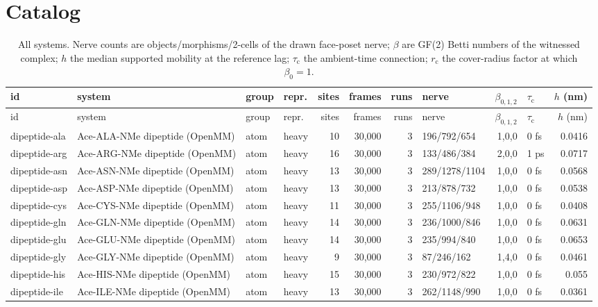 \documentclass[10pt]{article}
\begin{document}
\section*{Catalog}
\begin{small}\begin{longtable}{p{3.9cm}p{5.2cm}llrrrlrlr}
\caption{All systems. Nerve counts are objects/morphisms/2-cells of the drawn face-poset nerve; $\beta$ are GF(2) Betti numbers of the witnessed complex; $h$ the median supported mobility at the reference lag; $\tau_{\mathrm c}$ the ambient-time connection; $r_{\mathrm c}$ the cover-radius factor at which $\beta_0=1$.}\\
\toprule id & system & group & repr. & sites & frames & runs & nerve & $\beta_{0,1,2}$ & $\tau_{\mathrm c}$ & $h$ (nm)\\\midrule\endfirsthead
\toprule id & system & group & repr. & sites & frames & runs & nerve & $\beta_{0,1,2}$ & $\tau_{\mathrm c}$ & $h$ (nm)\\\midrule\endhead
dipeptide-ala & Ace-ALA-NMe dipeptide (OpenMM) & atom & heavy & 10 & 30,000 & 3 & 196/792/654 & 1,0,0 & 0 fs & 0.0416\\
dipeptide-arg & Ace-ARG-NMe dipeptide (OpenMM) & atom & heavy & 16 & 30,000 & 3 & 133/486/384 & 2,0,0 & 1 ps & 0.0717\\
dipeptide-asn & Ace-ASN-NMe dipeptide (OpenMM) & atom & heavy & 13 & 30,000 & 3 & 289/1278/1104 & 1,0,0 & 0 fs & 0.0568\\
dipeptide-asp & Ace-ASP-NMe dipeptide (OpenMM) & atom & heavy & 13 & 30,000 & 3 & 213/878/732 & 1,0,0 & 0 fs & 0.0538\\
dipeptide-cys & Ace-CYS-NMe dipeptide (OpenMM) & atom & heavy & 11 & 30,000 & 3 & 255/1106/948 & 1,0,0 & 0 fs & 0.0408\\
dipeptide-gln & Ace-GLN-NMe dipeptide (OpenMM) & atom & heavy & 14 & 30,000 & 3 & 236/1000/846 & 1,0,0 & 0 fs & 0.0631\\
dipeptide-glu & Ace-GLU-NMe dipeptide (OpenMM) & atom & heavy & 14 & 30,000 & 3 & 235/994/840 & 1,0,0 & 0 fs & 0.0653\\
dipeptide-gly & Ace-GLY-NMe dipeptide (OpenMM) & atom & heavy & 9 & 30,000 & 3 & 87/246/162 & 1,4,0 & 0 fs & 0.0461\\
dipeptide-his & Ace-HIS-NMe dipeptide (OpenMM) & atom & heavy & 15 & 30,000 & 3 & 230/972/822 & 1,0,0 & 0 fs & 0.055\\
dipeptide-ile & Ace-ILE-NMe dipeptide (OpenMM) & atom & heavy & 13 & 30,000 & 3 & 262/1148/990 & 1,0,0 & 0 fs & 0.0361\\

\end{longtable}
\end{small}
\end{document}
